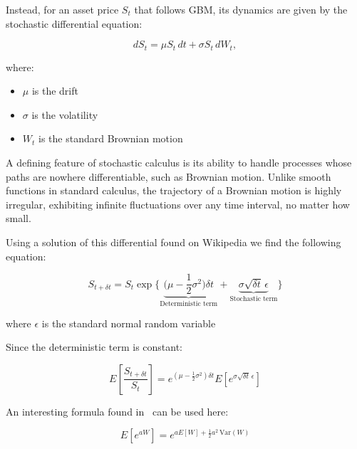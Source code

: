 \documentclass{article}
\begin{document}
    Instead, for an asset price $S_t$ that follows GBM, its dynamics are given by the stochastic differential equation:

    \begin{equation}
        \label{eq:gbm}
        dS_t = \mu S_t\, dt + \sigma S_t\, dW_t,
    \end{equation}

    where:
    \begin{itemize}
        \item $\mu$ is the drift
        \item $\sigma$ is the volatility
        \item $W_t$ is the standard Brownian motion
    \end{itemize}

    \bigskip

    \begin{tcolorbox}[note, title=Stochastic Calculus]
        A defining feature of stochastic calculus is its ability to handle processes whose paths are nowhere differentiable, such as Brownian motion.
        Unlike smooth functions in standard calculus, the trajectory of a Brownian motion is highly irregular, exhibiting infinite fluctuations over any time interval, no matter how small.
    \end{tcolorbox}

    \bigskip

    Using a solution of this differential found on Wikipedia we find the following equation:

    \[
        S_{t+\delta t} = S_t \exp
        \bigg\{
        \underbrace{\bigg( \mu - \frac{1}{2} \sigma^2 \bigg) \delta t}_{\text{Deterministic term}}
        +
        \underbrace{\sigma \sqrt{\delta t} \, \epsilon}_{\text{Stochastic term}}
        \bigg\}
    \]

    where $\epsilon$ is the standard normal random variable

    \bigskip

    Since the deterministic term is constant:

    \[E\!\left[\frac{S_{t+\delta t}}{S_t}\right] = e^{\left( \mu - \frac{1}{2} \sigma^2 \right) \delta t} E\!\left[e^{\sigma \sqrt{\delta t} \, \epsilon}\right] \]

    \bigskip

    An interesting formula found in~\cite[p.~637]{Ross2010} can be used here:

    \[E\left[e^{aW}\right] = e^{a E[W] + \frac{1}{2} a^2 \, \text{Var}(W)}\]
\end{document}

